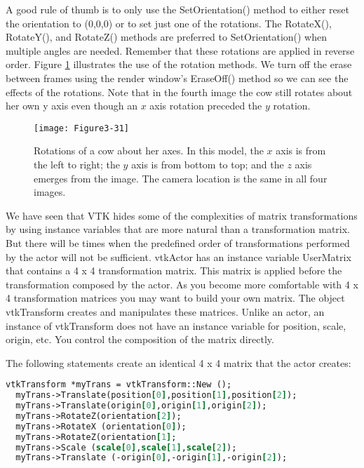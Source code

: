A good rule of thumb is to only use the SetOrientation() method to either reset the orientation to (0,0,0) or to set just one of the rotations. The RotateX(), RotateY(), and RotateZ() methods are preferred to SetOrientation() when multiple angles are needed. Remember that these rotations are applied in reverse order. Figure \ref{fig:Figure3-31} illustrates the use of the rotation methods. We turn off the erase between frames using the render window’s EraseOff() method so we can see the effects of the rotations. Note that in the fourth image the cow still rotates about her own y axis even though an $x$ axis rotation preceded the $y$ rotation.

\begin{figure}[!htb]
  \centering
  \texttt{[image: Figure3-31]}\\
  \caption{Rotations of a cow about her axes. In this model, the $x$ axis is from the left to right; the $y$ axis is from bottom to top; and the $z$ axis emerges from the image. The camera location is the same in all four images.}\label{fig:Figure3-31}
\end{figure}


We have seen that VTK hides some of the complexities of matrix transformations by using instance variables that are more natural than a transformation matrix. But there will be times when the predefined order of transformations performed by the actor will not be sufficient. vtkActor has an instance variable UserMatrix that contains a 4 x 4 transformation matrix. This matrix is applied before the transformation composed by the actor. As you become more comfortable with 4 x 4 transformation matrices you may want to build your own matrix. The object vtkTransform creates and manipulates these matrices. Unlike an actor, an instance of vtkTransform does not have an instance variable for position, scale, origin, etc. You control the composition of the matrix directly.

The following statements create an identical 4 x 4 matrix that the actor creates:

\begin{lstlisting}[language=TCL, caption={}]
vtkTransform *myTrans = vtkTransform::New ();
  myTrans->Translate(position[0],position[1],position[2]);
  myTrans->Translate(origin[0],origin[1],origin[2]);
  myTrans->RotateZ(orientation[2]);
  myTrans->RotateX (orientation[0]);
  myTrans->RotateZ(orientation[1];
  myTrans->Scale (scale[0],scale[1],scale[2]);
  myTrans->Translate (-origin[0],-origin[1],-origin[2]);
\end{lstlisting}

